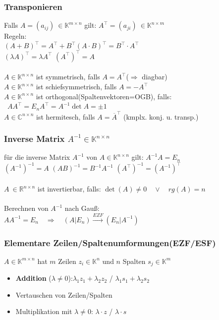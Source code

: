 \documentclass[6pt,a4paper]{scrartcl}
\begin{document}
\begin{multicols}{4}
\subsubsection{Transponieren}
Falls $A=(a_{ij})\ \in \mathbb K^{m\times n}$ gilt: $A^\top=(a_{ji})\ \in \mathbb K^{n\times m}$\\
Regeln:\\
$(A+B)^\top=A^\top+B^\top$\qquad $(A\cdot B)^\top=B^\top\cdot A^\top$\qquad \\ $(\lambda A)^\top=\lambda A^\top$ \qquad $(A^\top)^\top=A$\\
\\
$A\in \mathbb K^{n\times n}$ ist symmetrisch, falls $A=A^\top$\qquad ($\Rightarrow$ diagbar)\\
$A\in \mathbb K^{n\times n}$ ist schiefsymmetrisch, falls $A=-A^\top$\\
$A\in \mathbb K^{n\times n}$ ist orthogonal(Spaltenvektoren=OGB), falls:\\
\qquad\ $AA^\top=E_n$\qquad $A^\top=A^{-1}$\qquad $\det A=\pm 1$\\
$A\in \mathbb C^{n\times n}$ ist hermitesch, falls $A=\overline{A}^\top$  \quad (kmplx. konj. u. transp.)


\subsubsection{Inverse Matrix $A^{-1}\in \mathbb K^{n\times n}$}
für die inverse Matrix $A^{-1}$ von $A\in \mathbb K^{n\times n}$ gilt: $A^{-1}A=E_n$\\
$(A^{-1})^{-1}=A$ \qquad $(AB)^{-1}=B^{-1}A^{-1}$ \qquad $(A^\top)^{-1}=(A^{-1})^\top$\\
\\
$A\ \in \mathbb R^{n\times n}$ ist invertierbar, falls: $\det (A) \ne 0 \quad \lor \quad rg(A)=n$\\
\\
Berechnen von $A^{-1}$ nach Gauß:\\
$AA^{-1}=E_n\quad\Rightarrow\quad (A|E_n)\overset{EZF}{\longrightarrow}(E_n|A^{-1})$\\

\subsubsection{Elementare Zeilen/Spaltenumformungen(EZF/ESF)}
$A \in \mathbb K^{m\times n}$ hat $m$ Zeilen $z_i\in \mathbb K^n$ und $n$ Spalten $s_j\in \mathbb K^m$
\begin{itemize}\itemsep0pt
\item \textbf{Addition} ($\lambda\ne 0$):\quad $\lambda_1 z_1 + \lambda_2  z_2$ \quad / \quad $\lambda_1  s_1 + \lambda_2 s_2$
\item Vertauschen von Zeilen/Spalten
\item Multiplikation mit $\lambda\ne 0$: \quad $\lambda \cdot z$ \quad  / \quad  $\lambda \cdot s$
\end{itemize}


\end{multicols}
\end{document}
